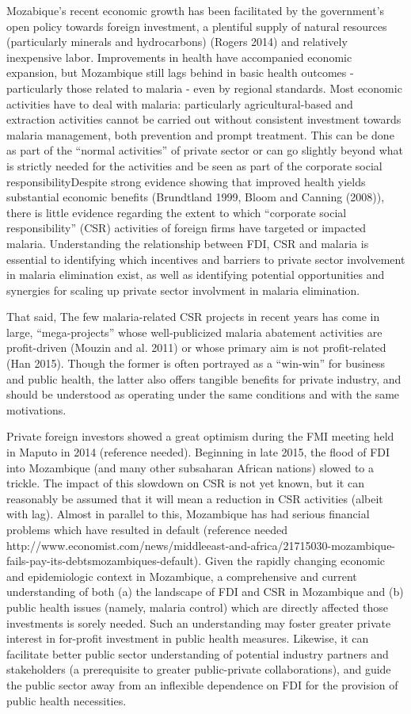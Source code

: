 \documentclass[]{elsarticle} %
\begin{document}
Mozabique's recent economic growth has been facilitated by the
government's open policy towards foreign investment, a plentiful supply
of natural resources (particularly minerals and hydrocarbons) (Rogers
2014) and relatively inexpensive labor. Improvements in health have
accompanied economic expansion, but Mozambique still lags behind in
basic health outcomes - particularly those related to malaria - even by
regional standards. Most economic activities have to deal with malaria:
particularly agricultural-based and extraction activities cannot be
carried out without consistent investment towards malaria management,
both prevention and prompt treatment. This can be done as part of the
``normal activities'' of private sector or can go slightly beyond what
is strictly needed for the activities and be seen as part of the
corporate social responsibilityDespite strong evidence showing that
improved health yields substantial economic benefits (Brundtland 1999,
Bloom and Canning (2008)), there is little evidence regarding the extent
to which ``corporate social responsibility'' (CSR) activities of foreign
firms have targeted or impacted malaria. Understanding the relationship
between FDI, CSR and malaria is essential to identifying which
incentives and barriers to private sector involvement in malaria
elimination exist, as well as identifying potential opportunities and
synergies for scaling up private sector involvment in malaria
elimination.

That said, The few malaria-related CSR projects in recent years has come
in large, ``mega-projects'' whose well-publicized malaria abatement
activities are profit-driven (Mouzin and al. 2011) or whose primary aim
is not profit-related (Han 2015). Though the former is often portrayed
as a ``win-win'' for business and public health, the latter also offers
tangible benefits for private industry, and should be understood as
operating under the same conditions and with the same motivations.

Private foreign investors showed a great optimism during the FMI meeting
held in Maputo in 2014 (reference needed). Beginning in late 2015, the
flood of FDI into Mozambique (and many other subsaharan African nations)
slowed to a trickle. The impact of this slowdown on CSR is not yet
known, but it can reasonably be assumed that it will mean a reduction in
CSR activities (albeit with lag). Almost in parallel to this, Mozambique
has had serious financial problems which have resulted in default
(reference needed
http://www.economist.com/news/middleeast-and-africa/21715030-mozambique-fails-pay-its-debtsmozambiques-default).
Given the rapidly changing economic and epidemiologic context in
Mozambique, a comprehensive and current understanding of both (a) the
landscape of FDI and CSR in Mozambique and (b) public health issues
(namely, malaria control) which are directly affected those investments
is sorely needed. Such an understanding may foster greater private
interest in for-profit investment in public health measures. Likewise,
it can facilitate better public sector understanding of potential
industry partners and stakeholders (a prerequisite to greater
public-private collaborations), and guide the public sector away from an
inflexible dependence on FDI for the provision of public health
necessities.
\end{document}
